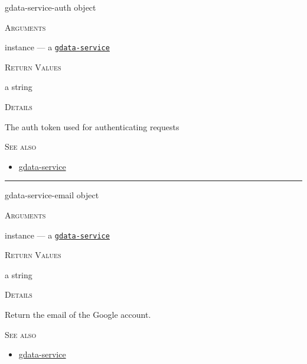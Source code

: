 \documentclass[a4paper]{report}
\begin{document}
    \label{cl-gdata-service__fun__gdata-service-auth}
    \begin{defun}[Function]
    gdata-service-auth object


    
    \bigskip
    \textsc{Arguments}

instance
	--- a \hyperref[cl-gdata-service__class__gdata-service]{\texttt{gdata-service}}
  




    
    \bigskip
    \textsc{Return Values}

a string


	
    \bigskip
    \textsc{Details}

              The auth token used for authenticating requests


      
    \bigskip
    \textsc{See also}


	
    \begin{itemize}
    
	  
    \item
    \hyperref[cl-gdata-service__class__gdata-service]{gdata-service}
    
	
    \end{itemize}
  
      


    
    \end{defun}
  
  

    \rule{\linewidth}{0.1mm}
    
    \label{cl-gdata-service__fun__gdata-service-email}
    \begin{defun}[Function]
    gdata-service-email object


    
    \bigskip
    \textsc{Arguments}

instance
	--- a \hyperref[cl-gdata-service__class__gdata-service]{\texttt{gdata-service}}
  




    
    \bigskip
    \textsc{Return Values}

a string


	
    \bigskip
    \textsc{Details}

              Return the email of the Google account.


      
    \bigskip
    \textsc{See also}


	
    \begin{itemize}
    
	  
    \item
    \hyperref[cl-gdata-service__class__gdata-service]{gdata-service}
    
	
    \end{itemize}
  
      


    
    \end{defun}
  
\end{document}
